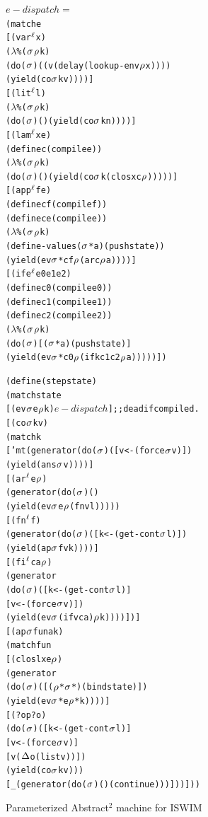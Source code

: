 \documentclass[preprint,onecolumn,9pt]{sigplanconf} %
\begin{document}
\begin{figure}
\begin{alltt}
\(e-dispatch =\)
(match e
  [(var\(\superscript\mlab\) x)
   (\(\lambda\)\% (\(\msto\) \(\menv\) k)
    (do (\(\msto\)) ((v (delay (lookup-env \(\menv\) x))))
      (yield (co \(\msto\) k v))))]
  [(lit\(\superscript\mlab\) l)
   (\(\lambda\)\% (\(\msto\) \(\menv\) k)
    (do (\(\msto\)) () (yield (co \(\msto\) k n))))]
  [(lam\(\superscript\mlab\) x e)
   (define c (compile e))
   (\(\lambda\)\% (\(\msto\) \(\menv\) k)
    (do (\(\msto\)) () (yield (co \(\msto\) k (clos x c \(\menv\))))))]
  [(app\(\superscript\mlab\) f e)
   (define cf (compile f))
   (define ce (compile e))
   (\(\lambda\)\% (\(\msto\) \(\menv\) k)
    (define-values (\(\msto\)* a) (push state))
    (yield (ev \(\msto\)* cf \(\menv\) (ar c \(\menv\) a))))]
  [(ife\(\superscript\mlab\) e0 e1 e2)
   (define c0 (compile e0))
   (define c1 (compile e1))
   (define c2 (compile e2))
   (\(\lambda\)\% (\(\msto\) \(\menv\) k)
     (do (\(\msto\)) [(\(\msto\)* a) (push state)]
      (yield (ev \(\msto\)* c0 \(\menv\) (ifk c1 c2 \(\menv\) a)))))])

(define (step state)
  (match state
    [(ev \(\msto\) e \(\menv\) k) \(e-dispatch\)] ;; dead if compiled.
    [(co \(\msto\) k v)
     (match k
       ['mt (generator (do (\(\msto\)) ([v <- (force \(\msto\) v)])
        (yield (ans \(\msto\) v))))]
       [(ar\(\superscript\mlab\) e \(\menv\))
        (generator (do (\(\msto\)) ()
          (yield (ev \(\msto\) e \(\menv\) (fn v l)))))
       [(fn\(\superscript\mlab\) f)
        (generator (do (\(\msto\)) ([k <- (get-cont \(\msto\) l)])
         (yield (ap \(\msto\) f v k))))]
       [(fi\(\superscript\mlab\) c a \(\menv\))
        (generator
         (do (\(\msto\)) ([k <- (get-cont \(\msto\) l)]
                  [v <- (force \(\msto\) v)])
           (yield (ev \(\msto\) (if v c a) \(\menv\) k))))])]
    [(ap \(\msto\) fun a k)
     (match fun
       [(clos l x e \(\menv\))
        (generator
         (do (\(\msto\)) ([(\(\menv\)* \(\msto\)*) (bind state)])
           (yield (ev \(\msto\)* e \(\menv\)* k))))]
       [(? op? o)
        (do (\(\msto\)) ([k <- (get-cont \(\msto\) l)]
                 [v <- (force \(\msto\) v)]
                 [v (\(\interpdelta\) o (list v))])
          (yield (co \(\msto\) k v)))
       [_ (generator (do (\(\msto\)) () (continue)))]))]))
\end{alltt}
\caption{Parameterized Abstract$^2$ machine for ISWIM}
\label{fig:paam}
\end{figure}
\end{document}
